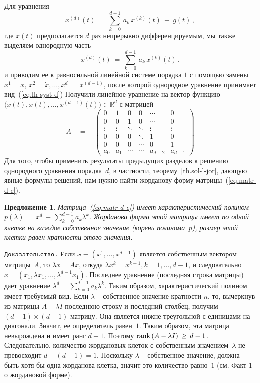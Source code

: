\documentclass[12pt,a4paper]{article}
\newtheorem{prop}{Предложение}
\newcommand{\re}{{\mathbb R}}
\begin{document}
Для уравнения
\begin{equation}\label{eq.l-order-d-c}
x^{(d)}(t) \ = \ \sum_{k=0}^{d-1} \, a_k\, x^{(k)}(t) \ + \ g(t)\, ,
\end{equation}
где $x(t)$ предполагается $d$ раз непрерывно дифференцируемым, мы также выделяем однородную часть
\begin{equation}\label{eq.const10h}
x^{(d)}(t) \ = \  \sum_{k=0}^{d-1} \, a_k\, x^{(k)}(t)\, .
\end{equation}
и приводим ее к равносильной линейной системе порядка $1$ с помощью
замены $x^1 = x, \, x^2 = \dot x , \ldots , x^d \, = \, x^{(d-1)}$,
после которой однородное уравнение принимает вид~(\ref{eq.lh-syst-d})
Получили линейное уравнение на вектор-функцию
$\bigl(x(t), \dot x (t), \ldots , x^{(d -1)}(t)\bigr) \in \re^d$ с матрицей
\begin{equation}\label{eq.matr-d-c}
A \quad  = \quad  \left(
\begin{array}{cccccc}
0 & 1 & 0 & 0 & \cdots & 0\\
0 & 0 & 1 & 0 & \cdots & 0\\
\vdots & \vdots & \ddots & \ddots & \vdots & \vdots \\
 0 & 0 & 0 & \ddots & 1 & 0 \\
 0 & 0 & 0 & \cdots & 0  & 1\\
 a_0 & a_1 & \cdots & \cdots & a_{d-2}  & a_{d-1}
\end{array}
\right)
\end{equation}
Для того, чтобы применить результаты предыдущих разделов к решению однородного уравнения порядка~$d$, в частности, теорему~\ref{th.sol-l-jor}, дающую явные формулы решений, нам нужно найти
жорданову форму матрицы~(\ref{eq.matr-d-c}).
\begin{prop}\label{p.lin-order-d}
Матрица~(\ref{eq.matr-d-c}) имеет характеристический полином $p(\lambda) \, = \, x^d \, - \, \sum_{k=0}^{d-1} a_k \lambda^k$.
Жорданова форма этой матрицы имеет по одной клетке на каждое собственное значение (корень полинома~$p$),
размер этой клетки равен кратности этого значения.
\end{prop}
{\tt Доказательство.}  Если $x = (x^1, \ldots , x^{d -1})$ является собственным вектором матрицы~$A$,
то $\lambda x = Ax$, откуда $\lambda x^{k} = x^{k+1}, k = 1, \ldots , d-1$, и следовательно  $x = (x_1, \lambda x_1, \ldots , \lambda^{d-1}x_1)$.
Последнее уравнение (последняя строка матрицы) дает уравнение $\lambda^d = \sum_{k=0}^{d-1} a_k \lambda^k$.
Таким образом, характеристический полином имеет требуемый вид. Если $\lambda$ -- собственное значение кратности
$n$, то, вычеркнув из матрицы $A - \lambda I$ последнюю строку и последний столбец, получим $(d -1)\times (d -1)$ матрицу.
Она является нижне-треугольной с единицами на диагонали. Значит, ее определитель равен~$1$. Таким образом, эта матрица невырождена и имеет ранг $d-1$. Поэтому ${\rm rank}\, (A - \lambda I) \, \ge \, d-1$. Следовательно, количество жордановых
клеток с собственным значением~$\lambda$ не превосходит $d - (d -1) = 1$. Поскольку $\lambda$ -- собственное значение,
должна быть хотя бы одна жорданова клетка, значит это количество равно~$1$ (см. Факт 1 о жордановой форме).
\end{document}
